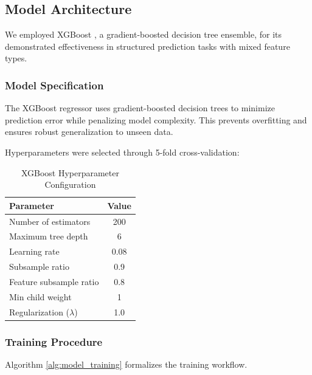 \documentclass[conference]{IEEEtran}
\begin{document}
\subsection{Model Architecture}

We employed XGBoost \cite{chen2016xgboost}, a gradient-boosted decision tree ensemble, for its demonstrated effectiveness in structured prediction tasks with mixed feature types.

\subsubsection{Model Specification}

The XGBoost regressor uses gradient-boosted decision trees to minimize prediction error while penalizing model complexity. This prevents overfitting and ensures robust generalization to unseen data.

Hyperparameters were selected through 5-fold cross-validation:

\begin{table}[h]
\centering
\caption{XGBoost Hyperparameter Configuration}
\begin{tabular}{lc}
\toprule
\textbf{Parameter} & \textbf{Value} \\
\midrule
Number of estimators & 200 \\
Maximum tree depth & 6 \\
Learning rate & 0.08 \\
Subsample ratio & 0.9 \\
Feature subsample ratio & 0.8 \\
Min child weight & 1 \\
Regularization ($\lambda$) & 1.0 \\
\bottomrule
\end{tabular}
\label{tab:hyperparameters}
\end{table}

\subsubsection{Training Procedure}

Algorithm \ref{alg:model_training} formalizes the training workflow.
\end{document}
